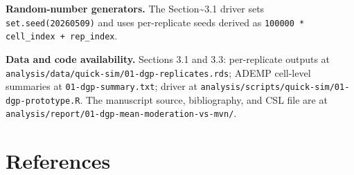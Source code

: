 \documentclass[
  11pt,
]{article}
\begin{document}
\textbf{Random-number generators.} The Section\textasciitilde3.1 driver
sets \texttt{set.seed(20260509)} and uses per-replicate seeds derived as
\texttt{100000 * cell\_index + rep\_index}.

\textbf{Data and code availability.} Sections 3.1 and 3.3: per-replicate
outputs at \texttt{analysis/data/quick-sim/01-dgp-replicates.rds}; ADEMP
cell-level summaries at \texttt{01-dgp-summary.txt}; driver at
\texttt{analysis/scripts/quick-sim/01-dgp-prototype.R}. The manuscript
source, bibliography, and CSL file are at
\texttt{analysis/report/01-dgp-mean-moderation-vs-mvn/}.

\section{References}\label{references}
\end{document}
